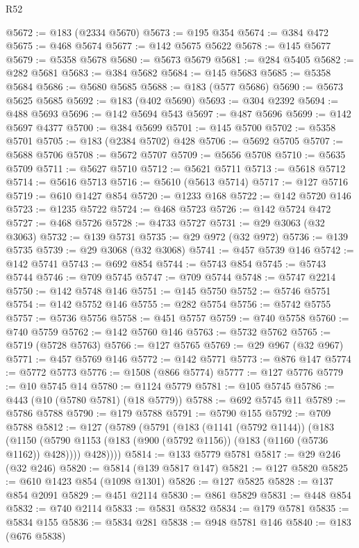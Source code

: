 \begin{lexlean}{R52}
\begin{coremodule}
{{{{{{{{{{{{{{{{{{{{{{{{{{{{{{{{{{{{{{{{{{{{{{{{{{{{{{{{{{{{{{{{{{{{{{{{{{{{{{{{{{{{{{{{{{{{{{{{{{{{{{{{{{{{{{{{{{{{{{{{{{{{{{{{{{{{{{{{{{{{{{{{{{{{{{{{{{{{{{{{{{{{{{{{{{{{{{{{{{{{{{{{{{{{{{{{{{{{{{@5672 := @183 (@2334 @5670)
@5673 := @195 @354
@5674 := @384 @472
@5675 := @468 @5674
@5677 := @142 @5675 @5622
@5678 := @145 @5677
@5679 := @5358 @5678
@5680 := @5673 @5679
@5681 := @284 @5405
@5682 := @282 @5681
@5683 := @384 @5682
@5684 := @145 @5683
@5685 := @5358 @5684
@5686 := @5680 @5685
@5688 := @183 (@577 @5686)
@5690 := @5673 @5625 @5685
@5692 := @183 (@402 @5690)
@5693 := @304 @2392
@5694 := @488 @5693
@5696 := @142 @5694 @543
@5697 := @487 @5696
@5699 := @142 @5697 @4377
@5700 := @384 @5699
@5701 := @145 @5700
@5702 := @5358 @5701
@5705 := @183 (@2384 @5702) @428
@5706 := @5692 @5705
@5707 := @5688 @5706
@5708 := @5672 @5707
@5709 := @5656 @5708
@5710 := @5635 @5709
@5711 := @5627 @5710
@5712 := @5621 @5711
@5713 := @5618 @5712
@5714 := @5616 @5713
@5716 := @5610 (@5613 @5714)
@5717 := @127 @5716
@5719 := @610 @1427 @854
@5720 := @1233 @168
@5722 := @142 @5720 @146
@5723 := @1235 @5722
@5724 := @468 @5723
@5726 := @142 @5724 @472
@5727 := @468 @5726
@5728 := @4733 @5727
@5731 := @29 @3063 (@32 @3063)
@5732 := @139 @5731
@5735 := @29 @972 (@32 @972)
@5736 := @139 @5735
@5739 := @29 @3068 (@32 @3068)
@5741 := @457 @5739 @146
@5742 := @142 @5741
@5743 := @692 @854
@5744 := @5743 @854
@5745 := @5743 @5744
@5746 := @709 @5745
@5747 := @709 @5744
@5748 := @5747 @2214
@5750 := @142 @5748 @146
@5751 := @145 @5750
@5752 := @5746 @5751
@5754 := @142 @5752 @146
@5755 := @282 @5754
@5756 := @5742 @5755
@5757 := @5736 @5756
@5758 := @451 @5757
@5759 := @740 @5758
@5760 := @740 @5759
@5762 := @142 @5760 @146
@5763 := @5732 @5762
@5765 := @5719 (@5728 @5763)
@5766 := @127 @5765
@5769 := @29 @967 (@32 @967)
@5771 := @457 @5769 @146
@5772 := @142 @5771
@5773 := @876 @147
@5774 := @5772 @5773
@5776 := @1508 (@866 @5774)
@5777 := @127 @5776
@5779 := @10 @5745 @14
@5780 := @1124 @5779
@5781 := @105 @5745
@5786 := @443 (@10 (@5780 @5781) (@18 @5779))
@5788 := @692 @5745 @11
@5789 := @5786 @5788
@5790 := @179 @5788
@5791 := @5790 @155
@5792 := @709 @5788
@5812 := @127
    (@5789
      (@5791
        (@183
          (@1141 (@5792 @1144))
          (@183
            (@1150 (@5790 @1153 (@183 (@900 (@5792 @1156)) (@183 (@1160 (@5736 @1162)) @428))))
            @428))))
@5814 := @133 @5779 @5781
@5817 := @29 @246 (@32 @246)
@5820 := @5814 (@139 @5817 @147)
@5821 := @127 @5820
@5825 := @610 @1423 @854 (@1098 @1301)
@5826 := @127 @5825
@5828 := @137 @854 @2091
@5829 := @451 @2114
@5830 := @861 @5829
@5831 := @448 @854
@5832 := @740 @2114
@5833 := @5831 @5832
@5834 := @179 @5781
@5835 := @5834 @155
@5836 := @5834 @281
@5838 := @948 @5781 @146
@5840 := @183 (@676 @5838)
}}}}}}}}}}}}}}}}}}}}}}}}}}}}}}}}}}}}}}}}}}}}}}}}}}}}}}}}}}}}}}}}}}}}}}}}}}}}}}}}}}}}}}}}}}}}}}}}}}}}}}}}}}}}}}}}}}}}}}}}}}}}}}}}}}}}}}}}}}}}}}}}}}}}}}}}}}}}}}}}}}}}}}}}}}}}}}}}}}}}}}}}}}}}}}}}}}}}}}
\end{coremodule}
\end{lexlean}
